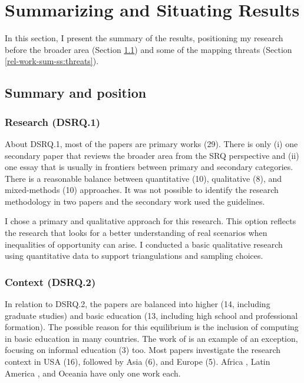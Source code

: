 \section{Summarizing and Situating Results}
\label{rel-work:sum-results}

In this section, I present the summary of the results, positioning my research before the broader area (Section \ref{rel-work-sum-ss:summary}) and some of the mapping threats (Section \ref{rel-work-sum-ss:threats}).

\subsection{Summary and position}
\label{rel-work-sum-ss:summary}

\subsubsection{Research (DSRQ.1)}

About \gls{DSRQ}.1, most of the papers are primary works (29). There is only (i) one secondary paper \cite{lai:2023}  that reviews the broader area from the \gls{SRQ} perspective and (ii) one essay \cite{michaelis:2022} that is usually in frontiers between primary and secondary categories. There is a reasonable balance between quantitative (10), qualitative (8), and mixed-methods (10) approaches. It was not possible to identify the research methodology in two papers \cite{michaelis:2022,akalin:2021} and the secondary work used the  guidelines.

I chose a primary and qualitative approach for this research. This option reflects the research that looks for a better understanding of real scenarios when inequalities of opportunity can arise. I conducted a basic qualitative research using quantitative data to support triangulations and sampling choices.

\subsubsection{Context (DSRQ.2)}

In relation to \gls{DSRQ}.2, the papers are balanced into higher (14, including graduate studies) and basic education (13, including high school and professional formation). The possible reason for this equilibrium is the inclusion of computing in basic education in many countries. The work of  is an example of an exception, focusing on informal education (3) too. Most papers investigate the research context in \gls{USA} (16), followed by Asia (6), and Europe (5). Africa \cite{arawjo:2021}, Latin America \cite{roque-hernandez:2021}, and Oceania \cite{shahin:2022} have only one work each.

